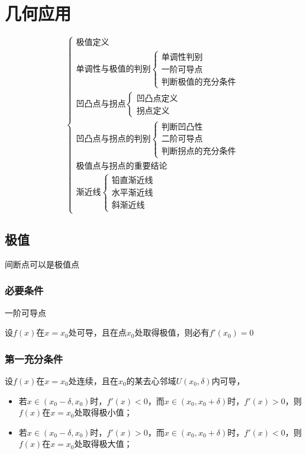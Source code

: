 
\chapter{几何应用}
\[\begin{cases}
\text{极值定义} \\ 
\text{单调性与极值的判别}\begin{cases}
\text{单调性判别} \\ 
\text{一阶可导点} \\ 
\text{判断极值的充分条件}\end{cases} \\ 
\text{凹凸点与拐点}\begin{cases}
\text{凹凸点定义} \\ 
\text{拐点定义}\end{cases} \\ 
\text{凹凸点与拐点的判别}\begin{cases}
\text{判断凹凸性} \\ 
\text{二阶可导点} \\ 
\text{判断拐点的充分条件}\end{cases} \\ 
\text{极值点与拐点的重要结论} \\ 
\text{渐近线}\begin{cases}
\text{铅直渐近线} \\ 
\text{水平渐近线} \\ 
\text{斜渐近线}\end{cases}
\end{cases}\]

\section{极值}

间断点可以是极值点

\subsection{必要条件}
一阶可导点

设\(f(x)\)在\(x = x_0\)处可导，且在点\(x_0\)处取得极值，则必有\(f'(x_0) = 0\)

\subsection{第一充分条件}
设\(f(x)\)在\(x = x_0\)处连续，且在\(x_0\)的某去心邻域\(U(x_0, \delta)\)内可导，\begin{itemize}
    \item 若\(x \in (x_0 - \delta, x_0)\)时，\(f'(x) < 0\)，而\(x \in (x_0, x_0 + \delta)\)时，\(f'(x) > 0\)，则\(f(x)\)在\(x = x_0\)处取得极小值；
    \item 若\(x \in (x_0 - \delta, x_0)\)时，\(f'(x) > 0\)，而\(x \in (x_0, x_0 + \delta)\)时，\(f'(x) < 0\)，则\(f(x)\)在\(x = x_0\)处取得极大值；
\end{itemize}


